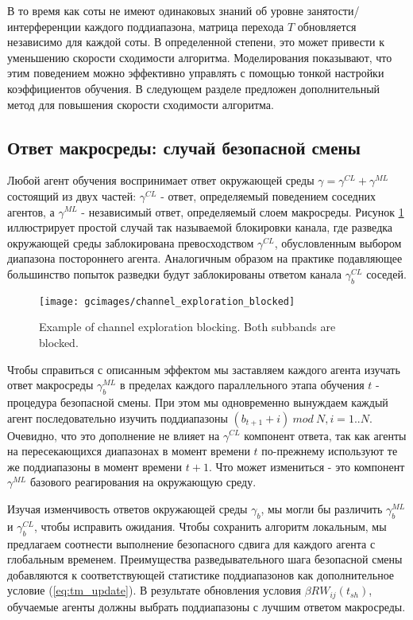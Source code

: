 В то время как соты не имеют одинаковых знаний об уровне занятости/интерференции каждого поддиапазона, матрица перехода $T$ обновляется независимо для каждой соты. В определенной степени, это может привести к уменьшению скорости сходимости алгоритма. Моделирования показывают, что этим поведением можно эффективно управлять с помощью тонкой настройки коэффициентов обучения. В следующем разделе предложен дополнительный метод для повышения скорости сходимости алгоритма.

\subsection{Ответ макросреды: случай безопасной смены}
\label{sec:safe_shift}
Любой агент обучения воспринимает ответ окружающей среды $\gamma = \gamma^{CL} + \gamma^{ML}$ состоящий из двух частей: $\gamma^{CL}$ - ответ, определяемый поведением соседних агентов, а $\gamma^{ML}$ - независимый ответ, определяемый слоем макросреды.
Рисунок \ref{fig:channel_exploration_blocked} иллюстрирует простой случай так называемой блокировки канала, где разведка окружающей среды заблокирована превосходством $\gamma^{CL}$, обусловленным выбором диапазона постороннего агента. Аналогичным образом на практике подавляющее большинство попыток разведки будут заблокированы ответом канала $\gamma_b^{CL}$ соседей. 

\begin{figure}[h!]
    \centering
    \texttt{[image: gcimages/channel\_exploration\_blocked]}
    \caption{Example of channel exploration blocking. Both subbands are blocked.}
    \label{fig:channel_exploration_blocked}
\end{figure}

Чтобы справиться с описанным эффектом мы заставляем каждого агента изучать ответ макросреды $\gamma_b^{ML}$ в пределах каждого параллельного этапа обучения $t$ - процедура безопасной смены. При этом мы одновременно вынуждаем каждый агент последовательно изучить поддиапазоны ${(b_{t+1}+i)~mod~N}, i=1..N$. Очевидно, что это дополнение не влияет на $\gamma^{CL}$ компонент ответа, так как агенты на пересекающихся диапазонах в момент времени $t$ по-прежнему используют те же поддиапазоны в момент времени ${t+1}$. Что может измениться - это компонент $\gamma^{ML}$ базового реагирования на окружающую среду.

Изучая изменчивость ответов окружающей среды $\gamma_b$, мы могли бы различить $\gamma_b^{ML}$ и $\gamma_b^{CL}$, чтобы исправить ожидания. Чтобы сохранить алгоритм локальным, мы предлагаем соотнести выполнение безопасного сдвига для каждого агента с глобальным временем. Преимущества разведывательного шага безопасной смены добавляются к соответствующей статистике поддиапазонов как дополнительное условие  (\ref{eq:tm_update}). В результате обновления условия $\beta RW_{ij}(t_{sh})$, обучаемые агенты должны выбрать поддиапазоны с лучшим ответом макросреды.

